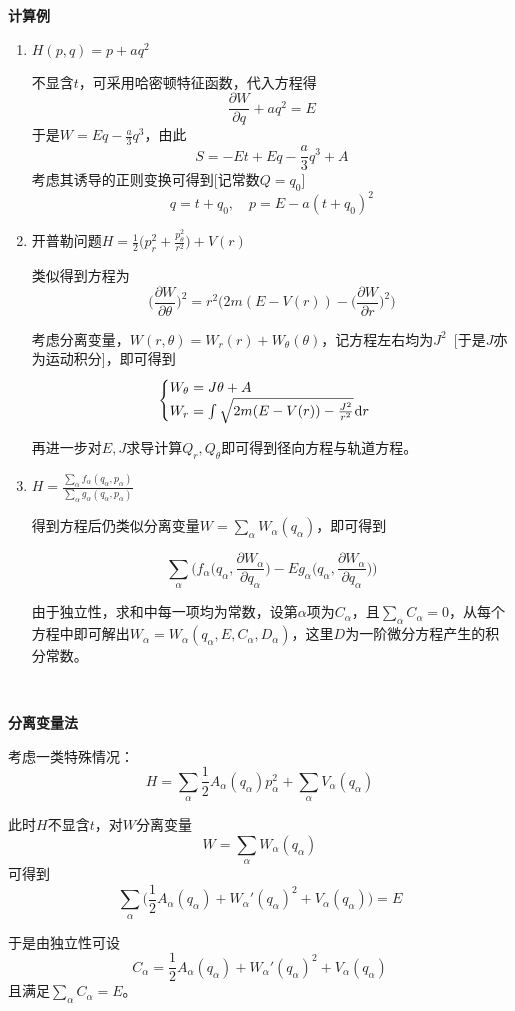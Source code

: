 \documentclass[a4paper,UTF8,fontset=windows]{ctexart}
\newcommand*{\dr}{\hspace{0.07em}\mathrm{d}}
\begin{document}
\textbf{计算例}
\begin{enumerate}
    \item $H(p,q)=p+aq^2$
    
    不显含$t$，可采用哈密顿特征函数，代入方程得
    $$\frac{\partial W}{\partial q}+aq^2=E$$
    于是$W=Eq-\frac{a}{3}q^3$，由此
    $$S=-Et+Eq-\frac{a}{3}q^3+A$$
    考虑其诱导的正则变换可得到[记常数$Q=q_0$]
    $$q=t+q_0,\quad p=E-a(t+q_0)^2$$

    \item 开普勒问题$H=\frac{1}{2}\big(p_r^2+\frac{p_\theta^2}{r^2}\big)+V(r)$
    
    类似得到方程为
    $$\bigg(\frac{\partial W}{\partial\theta}\bigg)^2=r^2\bigg(2m(E-V(r))-\bigg(\frac{\partial W}{\partial r}\bigg)^2\bigg)$$

    考虑分离变量，$W(r,\theta)=W_r(r)+W_\theta(\theta)$，记方程左右均为$J^2$\ [于是$J$亦为运动积分]，即可得到
    $$\begin{cases}W_\theta=J\theta +A\\W_r=\int\sqrt{2m(E-V(r))-\frac{J^2}{r^2}}\dr r\end{cases}$$

    再进一步对$E,J$求导计算$Q_r,Q_\theta$即可得到径向方程与轨道方程。

    \item $H=\frac{\sum_\alpha f_\alpha(q_\alpha,p_\alpha)}{\sum_\alpha g_\alpha(q_\alpha,p_\alpha)}$


    得到方程后仍类似分离变量$W=\sum_\alpha W_\alpha(q_\alpha)$，即可得到

    $$\sum_\alpha\bigg(f_\alpha\bigg(q_\alpha,\frac{\partial W_\alpha}{\partial q_\alpha}\bigg)-Eg_\alpha\bigg(q_\alpha,\frac{\partial W_\alpha}{\partial q_\alpha}\bigg)\bigg)$$

    由于独立性，求和中每一项均为常数，设第$\alpha$项为$C_\alpha$，且$\sum_\alpha C_\alpha=0$，从每个方程中即可解出$W_\alpha=W_\alpha(q_\alpha,E,C_\alpha,D_\alpha)$，这里$D$为一阶微分方程产生的积分常数。
\end{enumerate}

\

\textbf{分离变量法}

考虑一类特殊情况：
$$H=\sum_\alpha\frac{1}{2}A_\alpha(q_\alpha)p_\alpha^2+\sum_\alpha V_\alpha(q_\alpha)$$

此时$H$不显含$t$，对$W$分离变量
$$W=\sum_\alpha W_\alpha(q_\alpha)$$
可得到
$$\sum_\alpha\bigg(\frac{1}{2}A_\alpha(q_\alpha)+W_\alpha'(q_\alpha)^2+V_\alpha(q_\alpha)\bigg)=E$$

于是由独立性可设
$$C_\alpha=\frac{1}{2}A_\alpha(q_\alpha)+W_\alpha'(q_\alpha)^2+V_\alpha(q_\alpha)$$
且满足$\sum_\alpha C_\alpha=E$。
\end{document}
